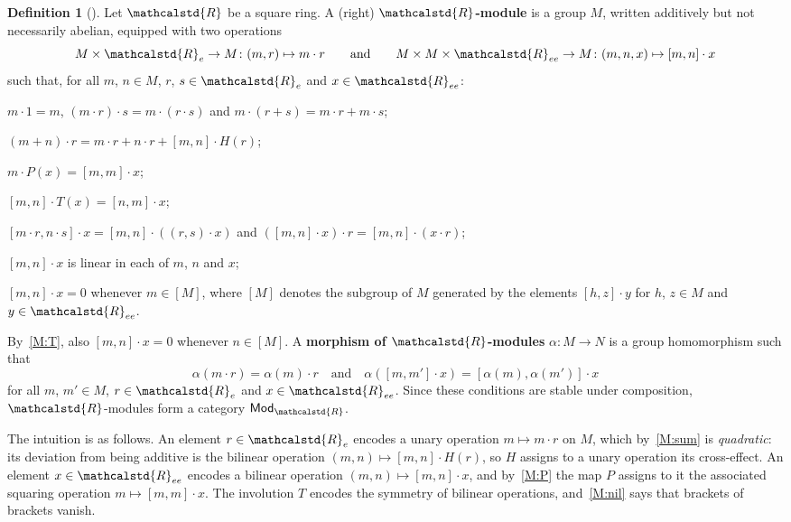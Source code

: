 \documentclass[reqno,a4paper]{amsart}
\theoremstyle{plain}
\theoremstyle{definition}
\newtheorem{definition}[subsection]{Definition}
\newcommand{\defn}{\textbf}
\newcommand{\R}{\ensuremath{\mathcalstd{R}}}
\newcommand{\Mod}{\ensuremath{\mathsf{Mod}}}
\renewcommand{\Re}{\ensuremath{\R_{e}}}
\newcommand{\Ree}{\ensuremath{\R_{ee}}}
\newcommand{\brk}[2]{\ensuremath{[#1,#2]}}
\begin{document}
\begin{definition}[{\cite[Definition~7.7]{BHP}}]\label{def:module}
  Let \(\R\) be a square ring. A (right) \defn{\(\R\)-module} is a group \(M\), written additively but not necessarily abelian, equipped with two operations
  \[
    M\times\Re\to M\colon (m,r)\mapsto m\cdot r\qquad\text{and}\qquad M\times M\times\Ree\to M\colon (m,n,x)\mapsto\brk{m}{n}\cdot x
  \]
  such that, for all \(m\), \(n\in M\), \(r\), \(s\in\Re\) and \(x\in\Ree\):
  \begin{modaxioms}
    \item\label{M:action} \(m\cdot 1=m\), \((m\cdot r)\cdot s=m\cdot(r\cdot s)\) and \(m\cdot(r+s)=m\cdot r+m\cdot s\);
    \item\label{M:sum} \((m+n)\cdot r=m\cdot r+n\cdot r+\brk{m}{n}\cdot H(r)\);
    \item\label{M:P} \(m\cdot P(x)=\brk{m}{m}\cdot x\);
    \item\label{M:T} \(\brk{m}{n}\cdot T(x)=\brk{n}{m}\cdot x\);
    \item\label{M:compatible} \(\brk{m\cdot r}{n\cdot s}\cdot x=\brk{m}{n}\cdot((r,s)\cdot x)\) and \((\brk{m}{n}\cdot x)\cdot r=\brk{m}{n}\cdot(x\cdot r)\);
    \item\label{M:trilinear} \(\brk{m}{n}\cdot x\) is linear in each of \(m\), \(n\) and \(x\);
    \item\label{M:nil} \(\brk{m}{n}\cdot x=0\) whenever \(m\in[M]\), where \([M]\) denotes the subgroup of \(M\) generated by the elements \(\brk{h}{z}\cdot y\) for \(h\), \(z\in M\) and \(y\in\Ree\).
  \end{modaxioms}
  By~\ref{M:T}, also \(\brk{m}{n}\cdot x=0\) whenever \(n\in[M]\). A \defn{morphism of \(\R\)-modules} \(\alpha\colon M\to N\) is a group homomorphism such that
  \[
    \alpha(m\cdot r)=\alpha(m)\cdot r
    \quad\text{and}\quad
    \alpha(\brk{m}{m'}\cdot x)=\brk{\alpha(m)}{\alpha(m')}\cdot x
  \]
  for all \(m\), \(m'\in M\), \(r\in\Re\) and \(x\in\Ree\). Since these conditions are stable under composition, \(\R\)-modules form a category \(\Mod_{\R}\).
\end{definition}

The intuition is as follows. An element \(r\in\Re\) encodes a unary operation \(m\mapsto m\cdot r\) on \(M\), which by~\ref{M:sum} is \emph{quadratic}: its deviation from being additive is the bilinear operation \((m,n)\mapsto\brk{m}{n}\cdot H(r)\), so \(H\) assigns to a unary operation its cross-effect. An element \(x\in\Ree\) encodes a bilinear operation \((m,n)\mapsto\brk{m}{n}\cdot x\), and by~\ref{M:P} the map \(P\) assigns to it the associated squaring operation \(m\mapsto\brk{m}{m}\cdot x\). The involution \(T\) encodes the symmetry of bilinear operations, and~\ref{M:nil} says that brackets of brackets vanish.
\end{document}
